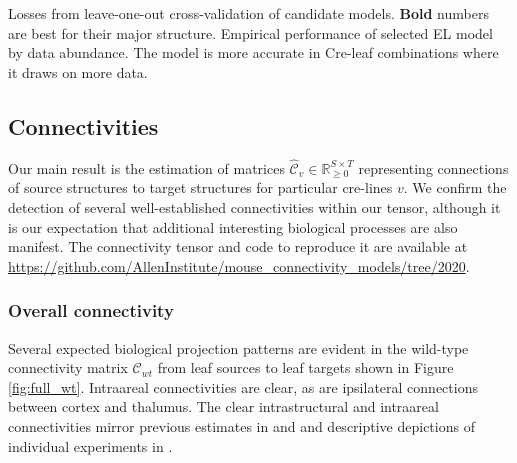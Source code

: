 \begin{table}[H]
{\label{tab:crossvalidation}
}
\caption{Losses from leave-one-out cross-validation of candidate models. \textbf{Bold} numbers are best for their major structure. Empirical performance of selected EL model by data abundance.  The model is more accurate in Cre-leaf combinations where it draws on more data.}
\end{table}


\subsection{Connectivities}

Our main result is the estimation of matrices $\hat {\mathcal C}_v \in \mathbb R_{\geq 0}^{S \times T}$ representing connections of source structures to target structures for particular cre-lines $v$. 
We confirm the detection of several well-established connectivities within our tensor, although it is our expectation that additional interesting biological processes are also manifest.
The connectivity tensor and code to reproduce it are available at \url{https://github.com/AllenInstitute/mouse_connectivity_models/tree/2020}.

\subsubsection{Overall connectivity}

Several expected biological projection patterns are evident in the wild-type connectivity matrix $\mathcal C_{wt}$ from leaf sources to leaf targets shown in Figure \ref{fig:full_wt}.
Intraareal connectivities are clear, as are ipsilateral connections between cortex and thalumus.
The clear intrastructural and intraareal connectivities mirror previous estimates in \citet{Oh2014-kh} and \citet{Knox2019-ot} and descriptive depictions of individual experiments in \citet{Harris2019-mr}.

